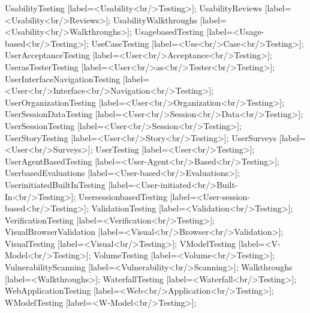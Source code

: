 \documentclass{article}
\begin{document}
{UsabilityTesting [label=<Usability<br/>Testing>];
UsabilityReviews [label=<Usability<br/>Reviews>];
UsabilityWalkthroughs [label=<Usability<br/>Walkthroughs>];
UsagebasedTesting [label=<Usage-based<br/>Testing>];
UseCaseTesting [label=<Use<br/>Case<br/>Testing>];
UserAcceptanceTesting [label=<User<br/>Acceptance<br/>Testing>];
UserasTesterTesting [label=<User<br/>as<br/>Tester<br/>Testing>];
UserInterfaceNavigationTesting [label=<User<br/>Interface<br/>Navigation<br/>Testing>];
UserOrganizationTesting [label=<User<br/>Organization<br/>Testing>];
UserSessionDataTesting [label=<User<br/>Session<br/>Data<br/>Testing>];
UserSessionTesting [label=<User<br/>Session<br/>Testing>];
UserStoryTesting [label=<User<br/>Story<br/>Testing>];
UserSurveys [label=<User<br/>Surveys>];
UserTesting [label=<User<br/>Testing>];
UserAgentBasedTesting [label=<User-Agent<br/>Based<br/>Testing>];
UserbasedEvaluations [label=<User-based<br/>Evaluations>];
UserinitiatedBuiltInTesting [label=<User-initiated<br/>Built-In<br/>Testing>];
UsersessionbasedTesting [label=<User-session-based<br/>Testing>];
ValidationTesting [label=<Validation<br/>Testing>];
VerificationTesting [label=<Verification<br/>Testing>];
VisualBrowserValidation [label=<Visual<br/>Browser<br/>Validation>];
VisualTesting [label=<Visual<br/>Testing>];
VModelTesting [label=<V-Model<br/>Testing>];
VolumeTesting [label=<Volume<br/>Testing>];
VulnerabilityScanning [label=<Vulnerability<br/>Scanning>];
Walkthroughs [label=<Walkthroughs>];
WaterfallTesting [label=<Waterfall<br/>Testing>];
WebApplicationTesting [label=<Web<br/>Application<br/>Testing>];
WModelTesting [label=<W-Model<br/>Testing>];

}
\end{document}
